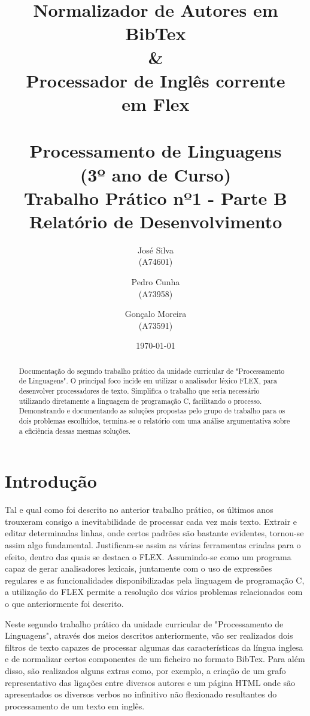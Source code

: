 \documentclass{report}
\title{ \textbf{Normalizador de Autores em BibTex}\\ 
\textbf{\&} \\
\textbf{Processador de Inglês corrente} \\ 
\textbf{em Flex} \\ \textbf{} \\
Processamento de Linguagens\\(3º ano de Curso)\\ 
\textbf{Trabalho Prático nº1 - Parte B}\\ Relatório de Desenvolvimento}
\author{José Silva\\ (A74601) \and Pedro Cunha\\ (A73958) \and Gonçalo Moreira\\ (A73591) }
\date{\today}
\begin{document}
\maketitle

\begin{abstract}
Documentação do segundo trabalho prático da unidade curricular de 
"Processamento de Linguagens". O principal foco incide em utilizar 
o analisador léxico FLEX, para desenvolver processadores de texto. 
Simplifica o trabalho que seria necessário utilizando diretamente a 
linguagem de programação C, facilitando o processo. 
Demonstrando e documentando as soluções propostas pelo grupo de 
trabalho para os dois problemas escolhidos, termina-se o relatório 
com uma análise argumentativa sobre a eficiência dessas mesmas soluções. 
\end{abstract}

\tableofcontents


\chapter{Introdução} \label{intro}
Tal e qual como foi descrito no anterior trabalho prático, os últimos 
anos trouxeram consigo a inevitabilidade de processar cada vez mais texto. 
Extrair e editar determinadas linhas, onde certos padrões são bastante 
evidentes, tornou-se assim algo fundamental. Justificam-se assim as várias 
ferramentas criadas para o efeito, dentro das quais se destaca o FLEX. 
Assumindo-se como um programa capaz de gerar analisadores lexicais, 
juntamente com o uso de expressões regulares e as funcionalidades 
disponibilizadas pela linguagem de programação C, a utilização do 
FLEX permite a resolução dos vários problemas relacionados com o que 
anteriormente foi descrito.


Neste segundo trabalho prático da unidade curricular de 
"Processamento de Linguagens", através dos meios descritos 
anteriormente, vão ser realizados dois filtros de texto capazes 
de processar algumas das características da língua inglesa e de 
normalizar certos componentes de um ficheiro no formato BibTex. 
Para além disso, são realizados alguns extras como, por exemplo, 
a criação de um grafo representativo das ligações entre diversos 
autores e um página HTML onde são apresentados os diversos verbos 
no infinitivo não flexionado resultantes do processamento de um 
texto em inglês.
\end{document}

